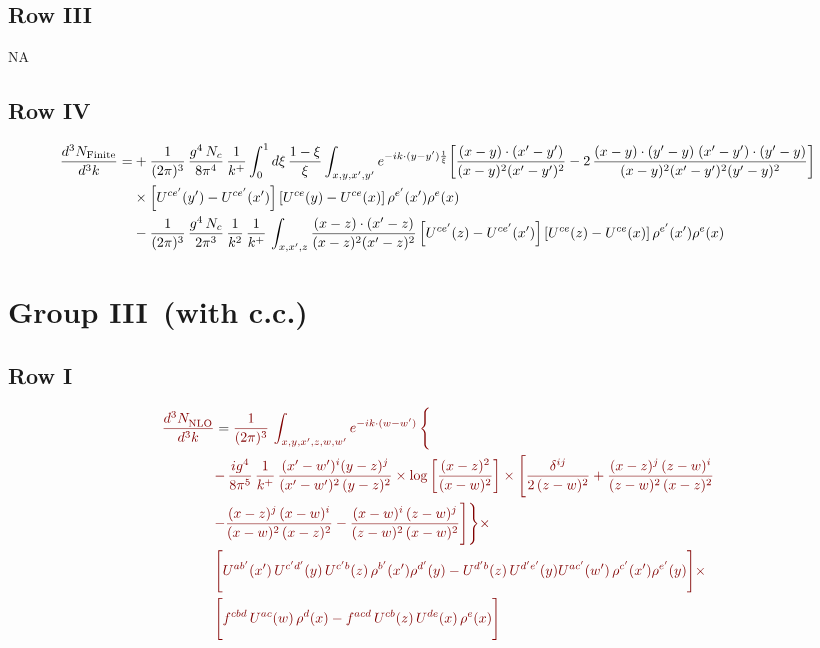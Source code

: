 \documentclass[9pt]{article}
\numberwithin{equation}{section}
\begin{document}
\subsection{Row III}
\textsc{NA}
\subsection{Row IV}
\begin{align}
\frac{d^{3}N_{\rm Finite}}{d^{3}k}= &  +\frac{1}{(2\pi)^{3}}\,\frac{g^{4}\,N_{c}}{8\pi^{4}}\,\frac{1}{k^{+}}\int_{0}^{1}d\xi\,\frac{1-\xi}{\xi}\int_{x,y,x',y'}e^{-ik\cdot(y-y')\frac{1}{\xi}}\bigg[\frac{(x-y)\cdot(x'-y')}{(x-y)^{2}(x'-y')^{2}}-2\,\frac{(x-y)\cdot(y'-y)\;(x'-y')\cdot(y'-y)}{(x-y)^{2}(x'-y')^{2}(y'-y)^{2}}\bigg]\notag\\
&\times\left[U^{ce'}(y') - U^{ce'}(x')\right]\left[U^{ce}(y) - U^{ce}(x)\right]\rho^{e'}(x')\rho^{e}(x)\notag \\ & -\frac{1}{(2\pi)^{3}}\,\frac{g^{4}\,N_{c}}{2\pi^{3}}\,\frac{1}{k^{2}}\,\frac{1}{k^{+}}\,\int_{x,x',z}\frac{(x-z)\cdot(x'-z)}{(x-z)^{2}(x'-z)^{2}}\left[U^{ce'}(z) - U^{ce'}(x')\right]\left[U^{ce}(z) - U^{ce}(x)\right]\rho^{e'}(x')\rho^{e}(x)
\end{align}
\section{Group III\, (with c.c.)}
\subsection{Row I}
\begin{align}
     {\color{red!50!black}\frac{d^{3}N_{\rm NLO}^{\rm}}{d^{3}k}}  & = {\color{red!50!black}\frac{1}{(2\pi)^{3}}\, \int_{x,y,x',z,w,w^{\prime}} e^{-ik\cdot (w-w')}\, \Bigg\{}\notag \\
& {\color{red!50!black}-\,\frac{ig^{4}}{8\pi^{5}}\,\frac{1}{k^{+}}\,\frac{(x'-w')^{i}(y-z)^{j}}{(x'-w')^{2}\,(y-z)^{2}}\times \log{\left[\frac{(x-z)^{2}}{(x-w)^{2}}\right]}\times \Bigg[\frac{\delta^{ij}}{2\,(z-w)^{2}}+\frac{(x-z)^{j}\,(z-w)^{i}}{(z-w)^{2}\,(x-z)^{2}}}\notag \\ & {\color{red!50!black}-\frac{(x-z)^{j}\,(x-w)^{i}}{(x-w)^{2}\,(x-z)^{2}}-\frac{(x-w)^{i}\,(z-w)^{j}}{(z-w)^{2}\,(x-w)^{2}}\Bigg]\Bigg\}\times} \notag \\ &  {\color{red!50!black}\Bigg[U^{ab'}(x')\,U^{c'd'}(y)\,U^{c'b}(z)\,\rho^{b'}(x')\rho^{d'}(y)-U^{d'b}(z)\,U^{d'e'}(y)U^{ac'}(w')\,\rho^{c'}(x')\rho^{e'}(y)\Bigg]\times}\notag \\ & {\color{red!50!black}\Bigg[f^{cbd}\,U^{ac}(w)\,\rho^{d}(x)-f^{acd}\, U^{cb}(z)\,U^{de}(x)\,\rho^{e}(x)\Bigg]}
\end{align}
\end{document}
